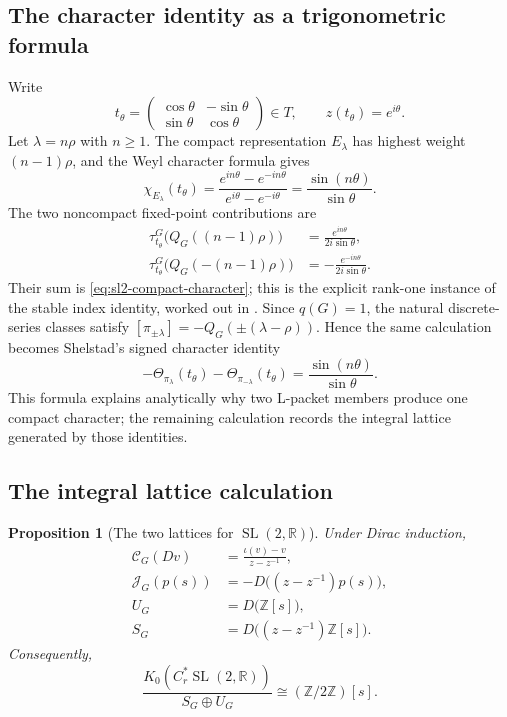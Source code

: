 \documentclass[11pt]{amsart}
\newtheorem{proposition}[theorem]{Proposition}
\theoremstyle{definition}
\theoremstyle{remark}
\newcommand{\R}{\mathbb R}
\newcommand{\Z}{\mathbb Z}
\newcommand{\Cr}{C_r^*}
\newcommand{\SL}{\operatorname{SL}}
\begin{document}
\subsection{The character identity as a trigonometric formula}

Write
\[
  t_\theta=
  \begin{pmatrix}
    \cos\theta&-\sin\theta\\
    \sin\theta&\cos\theta
  \end{pmatrix}\in T,
  \qquad z(t_\theta)=e^{i\theta}.
\]
Let \(\lambda=n\rho\) with \(n\geq1\).  The compact representation
\(E_\lambda\) has highest weight \((n-1)\rho\), and the Weyl character formula
gives
\begin{equation}\label{eq:sl2-compact-character}
  \chi_{E_\lambda}(t_\theta)
  =\frac{e^{in\theta}-e^{-in\theta}}
        {e^{i\theta}-e^{-i\theta}}
  =\frac{\sin(n\theta)}{\sin\theta}.
\end{equation}
The two noncompact fixed-point contributions are
\begin{align}
  \tau_{t_\theta}^G\bigl(Q_G((n-1)\rho)\bigr)
  &=\frac{e^{in\theta}}{2i\sin\theta},\label{eq:sl2-positive-index}\\
  \tau_{t_\theta}^G\bigl(Q_G(-(n-1)\rho)\bigr)
  &=-\frac{e^{-in\theta}}{2i\sin\theta}.
    \label{eq:sl2-negative-index}
\end{align}
Their sum is \eqref{eq:sl2-compact-character}; this is the explicit rank-one
instance of the stable index identity, worked out in
\cite[Section~3.5]{HochsWang2018Shelstad}.  Since \(q(G)=1\), the natural
discrete-series classes satisfy
\([\pi_{\pm\lambda}]=-Q_G(\pm(\lambda-\rho))\).  Hence the same calculation
becomes Shelstad's signed character identity
\[
  -\Theta_{\pi_\lambda}(t_\theta)
  -\Theta_{\pi_{-\lambda}}(t_\theta)
  =\frac{\sin(n\theta)}{\sin\theta}.
\]
This formula explains analytically why two L-packet members produce one compact
character; the remaining calculation records the integral lattice generated by
those identities.

\subsection{The integral lattice calculation}

\begin{proposition}[The two lattices for $\SL(2,\R)$]\label{prop:sl2}
Under Dirac induction,
\begin{align}
  \mathcal C_G(Dv)
  &=\frac{\iota(v)-v}{z-z^{-1}},\label{eq:sl2-C}\\
  \mathcal J_G(p(s))
  &=-D\bigl((z-z^{-1})p(s)\bigr),\label{eq:sl2-J}\\
  U_G&=D\bigl(\Z[s]\bigr),\label{eq:sl2-U}\\
  S_G&=D\bigl((z-z^{-1})\Z[s]\bigr).\label{eq:sl2-S}
\end{align}
Consequently,
\begin{equation}\label{eq:sl2-quotient}
  \frac{K_0(\Cr\SL(2,\R))}{S_G\oplus U_G}
  \cong(\Z/2\Z)[s].
\end{equation}
\end{proposition}
\end{document}
